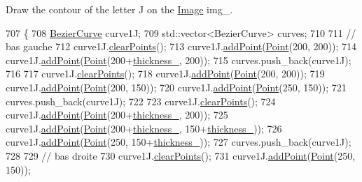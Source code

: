 Draw the contour of the letter J on the \mbox{\hyperlink{class_image}{Image}} img\+\_\+. 


\begin{DoxyCode}
707               \{
708     \mbox{\hyperlink{class_bezier_curve}{BezierCurve}} curve1J;
709     std::vector<BezierCurve> curves;
710 
711     \textcolor{comment}{// bas gauche}
712     curve1J.\mbox{\hyperlink{class_bezier_curve_a0ba8ce66d5af5971ae6a1b506029728e}{clearPoints}}();
713     curve1J.\mbox{\hyperlink{class_bezier_curve_a38d16c18b36ae45619b05e26e226cf34}{addPoint}}(\mbox{\hyperlink{class_point}{Point}}(200, 200));
714     curve1J.\mbox{\hyperlink{class_bezier_curve_a38d16c18b36ae45619b05e26e226cf34}{addPoint}}(\mbox{\hyperlink{class_point}{Point}}(200+\mbox{\hyperlink{class_font_v1_aed8040e76be9a52833627b92f0fb4e5f}{thickness\_}}, 200));
715     curves.push\_back(curve1J);
716 
717     curve1J.\mbox{\hyperlink{class_bezier_curve_a0ba8ce66d5af5971ae6a1b506029728e}{clearPoints}}();
718     curve1J.\mbox{\hyperlink{class_bezier_curve_a38d16c18b36ae45619b05e26e226cf34}{addPoint}}(\mbox{\hyperlink{class_point}{Point}}(200, 200));
719     curve1J.\mbox{\hyperlink{class_bezier_curve_a38d16c18b36ae45619b05e26e226cf34}{addPoint}}(\mbox{\hyperlink{class_point}{Point}}(200, 150));
720     curve1J.\mbox{\hyperlink{class_bezier_curve_a38d16c18b36ae45619b05e26e226cf34}{addPoint}}(\mbox{\hyperlink{class_point}{Point}}(250, 150));
721     curves.push\_back(curve1J);
722 
723     curve1J.\mbox{\hyperlink{class_bezier_curve_a0ba8ce66d5af5971ae6a1b506029728e}{clearPoints}}();
724     curve1J.\mbox{\hyperlink{class_bezier_curve_a38d16c18b36ae45619b05e26e226cf34}{addPoint}}(\mbox{\hyperlink{class_point}{Point}}(200+\mbox{\hyperlink{class_font_v1_aed8040e76be9a52833627b92f0fb4e5f}{thickness\_}}, 200));
725     curve1J.\mbox{\hyperlink{class_bezier_curve_a38d16c18b36ae45619b05e26e226cf34}{addPoint}}(\mbox{\hyperlink{class_point}{Point}}(200+\mbox{\hyperlink{class_font_v1_aed8040e76be9a52833627b92f0fb4e5f}{thickness\_}}, 150+\mbox{\hyperlink{class_font_v1_aed8040e76be9a52833627b92f0fb4e5f}{thickness\_}}));
726     curve1J.\mbox{\hyperlink{class_bezier_curve_a38d16c18b36ae45619b05e26e226cf34}{addPoint}}(\mbox{\hyperlink{class_point}{Point}}(250, 150+\mbox{\hyperlink{class_font_v1_aed8040e76be9a52833627b92f0fb4e5f}{thickness\_}}));
727     curves.push\_back(curve1J);
728 
729     \textcolor{comment}{// bas droite}
730     curve1J.\mbox{\hyperlink{class_bezier_curve_a0ba8ce66d5af5971ae6a1b506029728e}{clearPoints}}();
731     curve1J.\mbox{\hyperlink{class_bezier_curve_a38d16c18b36ae45619b05e26e226cf34}{addPoint}}(\mbox{\hyperlink{class_point}{Point}}(250, 150));

\end{DoxyCode}
